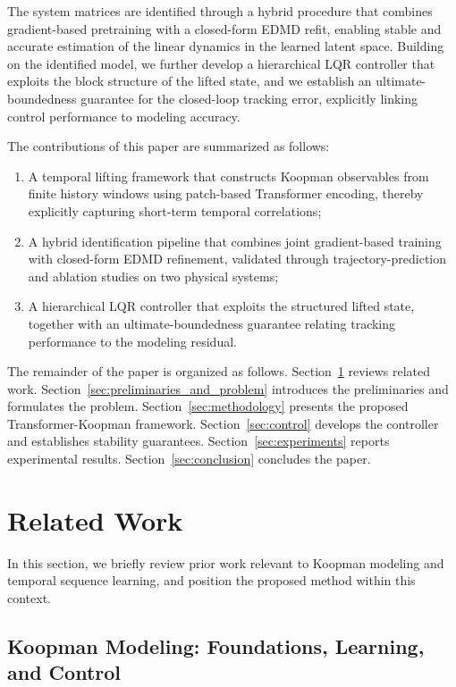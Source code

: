 \documentclass[journal]{IEEEtran}
\begin{document}
The system matrices are identified through a hybrid procedure that combines gradient-based pretraining with a closed-form EDMD refit, enabling stable and accurate estimation of the linear dynamics in the learned latent space. Building on the identified model, we further develop a hierarchical LQR controller that exploits the block structure of the lifted state, and we establish an ultimate-boundedness guarantee for the closed-loop tracking error, explicitly linking control performance to modeling accuracy.

The contributions of this paper are summarized as follows:
\begin{enumerate}
\item A temporal lifting framework that constructs Koopman observables from finite history windows using patch-based Transformer encoding, thereby explicitly capturing short-term temporal correlations;
\item A hybrid identification pipeline that combines joint gradient-based training with closed-form EDMD refinement, validated through trajectory-prediction and ablation studies on two physical systems;
\item A hierarchical LQR controller that exploits the structured lifted state, together with an ultimate-boundedness guarantee relating tracking performance to the modeling residual.
\end{enumerate}

The remainder of the paper is organized as follows. Section~\ref{sec:related_work} reviews related work. Section~\ref{sec:preliminaries_and_problem} introduces the preliminaries and formulates the problem. Section~\ref{sec:methodology} presents the proposed Transformer-Koopman framework. Section~\ref{sec:control} develops the controller and establishes stability guarantees. Section~\ref{sec:experiments} reports experimental results. Section~\ref{sec:conclusion} concludes the paper.

\section{Related Work}
\label{sec:related_work}

In this section, we briefly review prior work relevant to Koopman modeling and temporal sequence learning, and position the proposed method within this context.

\subsection{Koopman Modeling: Foundations, Learning, and Control}
\end{document}
